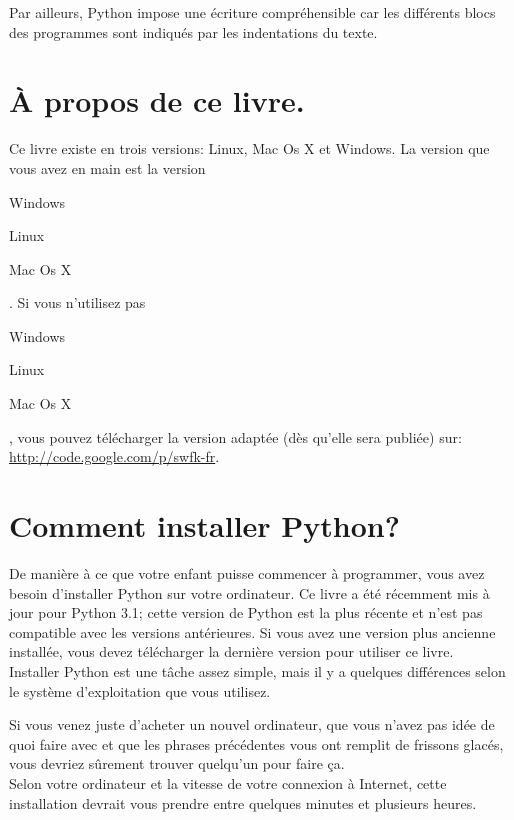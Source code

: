 Par ailleurs, Python impose une écriture compréhensible car les différents blocs des programmes sont indiqués par les indentations du texte.

\section*{À propos de ce livre.}

Ce livre existe en trois versions: Linux, Mac Os X et Windows. La version que vous avez en main est la version  \begin{WINDOWS}Windows\end{WINDOWS}\begin{LINUX}Linux\end{LINUX}\begin{MAC}Mac Os X\end{MAC}. Si vous n'utilisez pas \begin{WINDOWS}Windows\end{WINDOWS}\begin{LINUX}Linux\end{LINUX}\begin{MAC}Mac Os X\end{MAC}, vous pouvez télécharger la version adaptée (dès qu'elle sera publiée) sur: \url{http://code.google.com/p/swfk-fr}.
\\
\bigskip
\section*{Comment installer Python?}
De manière à ce que votre enfant puisse commencer à programmer, vous avez besoin d'installer Python sur votre ordinateur. Ce livre a été récemment mis à jour pour Python 3.1; cette version de Python est la plus récente et n'est pas compatible avec les versions antérieures. Si vous avez une version plus ancienne installée, vous devez télécharger la dernière version pour utiliser ce livre.
\\


Installer Python est une tâche assez simple, mais il y a quelques différences selon le système d'exploitation que vous utilisez. 




Si vous venez juste d'acheter un nouvel ordinateur, que vous n'avez pas idée de quoi faire avec et que les phrases précédentes vous ont remplit de frissons glacés, vous devriez sûrement trouver quelqu'un pour faire ça.\\


Selon votre ordinateur et la vitesse de votre connexion à Internet, cette installation devrait vous prendre entre quelques minutes et plusieurs heures.

